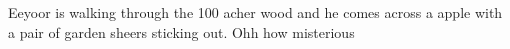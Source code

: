Eeyoor is walking through the 100 acher wood and he comes across a apple with a pair of garden sheers sticking out. Ohh how misterious
